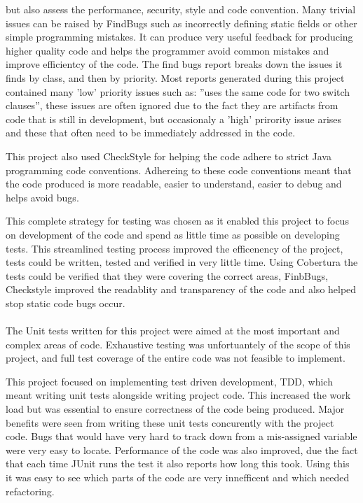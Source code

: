 \documentclass[12pt]{article}
\begin{document}
but also assess the performance, security, style and code convention. Many trivial issues can be raised by FindBugs such as 
incorrectly defining static fields or other simple programming mistakes. It can produce very useful feedback for producing
higher quality code and helps the programmer avoid common mistakes and improve efficientcy of the code. The find bugs report breaks
down the issues it finds by class, and then by priority. Most reports generated during this project contained many 'low' priority
issues such as: ''uses the same code for two switch clauses'', these issues are often ignored due to the fact they are artifacts
from code that is still in development, but occasionaly a 'high' prirority issue arises and these that often need to be immediately
addressed in the code. 

This project also used
CheckStyle for helping the code adhere to strict Java programming code conventions. Adhereing to these code conventions meant that
the code produced is more readable, easier to understand, easier to debug and helps avoid bugs.

This complete strategy for testing was chosen as it enabled this project to focus on development of the code and spend as little
time as possible on developing tests. This streamlined testing process improved the efficenency of the project, tests could 
be written, tested and verified in very little time. Using Cobertura the tests could be verified that they were covering the
correct areas, FinbBugs, Checkstyle improved the readablity and transparency of the code and also helped stop static code
bugs occur.


\paragraph{}

The Unit tests written for this project were aimed at the most important and complex areas of code. Exhaustive testing was 
unfortuantely of the scope of this project, and full test coverage of the entire code was not feasible to implement.

This project focused on implementing test driven development, TDD, which meant writing unit tests alongside writing project code.
This increased the work load but was essential to ensure correctness of the code being produced. Major benefits were seen from
writing these unit tests concurently with the project code. Bugs that would have very hard to track down from a mis-assigned
variable were very easy to locate. Performance of the code was also improved, due the fact that each time JUnit runs the test
it also reports how long this took. Using this it was easy to see which parts of the code are very innefficent and which needed
refactoring. 
\end{document}
